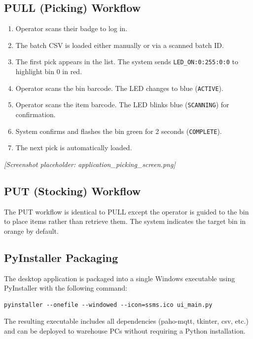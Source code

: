 \subsection{PULL (Picking) Workflow}
\label{sec:pull-workflow}

\begin{enumerate}
  \item Operator scans their badge to log in.
  \item The batch CSV is loaded either manually or via a scanned batch ID.
  \item The first pick appears in the list. The system sends \texttt{LED\_ON:0:255:0:0} to highlight bin 0 in red.
  \item Operator scans the bin barcode. The LED changes to blue (\texttt{ACTIVE}).
  \item Operator scans the item barcode. The LED blinks blue (\texttt{SCANNING}) for confirmation.
  \item System confirms and flashes the bin green for 2 seconds (\texttt{COMPLETE}).
  \item The next pick is automatically loaded.
\end{enumerate}

\textit{[Screenshot placeholder: application\_picking\_screen.png]}

\subsection{PUT (Stocking) Workflow}
\label{sec:put-workflow}

The PUT workflow is identical to PULL except the operator is guided to the bin to place items rather than retrieve them. The system indicates the target bin in orange by default.

\subsection{PyInstaller Packaging}
\label{sec:pyinstaller}

The desktop application is packaged into a single Windows executable using PyInstaller\cite{pyinstaller_docs} with the following command:

\begin{lstlisting}[caption=PyInstaller build command, label=lst:pyinstaller]
pyinstaller --onefile --windowed --icon=ssms.ico ui_main.py
\end{lstlisting}

The resulting executable includes all dependencies (paho-mqtt, tkinter, csv, etc.) and can be deployed to warehouse PCs without requiring a Python installation.


